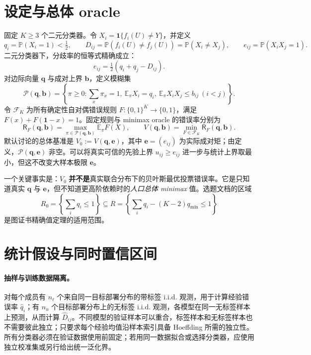 \documentclass[11pt,a4paper]{ctexart}
\theoremstyle{definition}
\newcommand{\calP}{\mathcal P}
\newcommand{\calF}{\mathcal F}
\newcommand{\Rsk}{\mathsf R}
\newcommand{\Pp}{\mathbb P}
\newcommand{\Ee}{\mathbb E}
\newcommand{\one}{\mathbf 1}
\newcommand{\evec}{\bm e}
\newcommand{\qvec}{\bm q}
\newcommand{\bvec}{\bm b}
\begin{document}
\section{设定与总体 oracle}
固定 $K\ge3$ 个二元分类器。令 $X_i=\one\{f_i(U)\ne Y\}$，并定义
\begin{equation}\label{eq:qD}
q_i=\Pp(X_i=1)<\tfrac12,\qquad
D_{ij}=\Pp(f_i(U)\ne f_j(U))=\Pp(X_i\ne X_j),\qquad
e_{ij}=\Pp(X_iX_j=1).
\end{equation}
二元分类器下，分歧率的恒等式精确成立：
\begin{equation}\label{eq:id}
e_{ij}=\tfrac12(q_i+q_j-D_{ij}).
\end{equation}
对边际向量 $\qvec$ 与成对上界 $\bvec$，定义模糊集
\begin{equation}\label{eq:ambig}
\calP(\qvec,\bvec)=\left\{\pi\ge0:\sum_x\pi_x=1,\ \Ee_\pi X_i=q_i,\ \Ee_\pi X_iX_j\le b_{ij}\ (i<j)\right\}.
\end{equation}
令 $\calF_K$ 为所有确定性自对偶错误规则 $F:\{0,1\}^K\to\{0,1\}$，满足 $F(x)+F(\one-x)=1$。固定规则与 minimax oracle 的错误率分别为
\begin{equation}\label{eq:R}
\Rsk_F(\qvec,\bvec)=\max_{\pi\in\calP(\qvec,\bvec)}\Ee_\pi F(X),\qquad
V(\qvec,\bvec)=\min_{F\in\calF_K}\Rsk_F(\qvec,\bvec).
\end{equation}
默认讨论的总体基准是 $V_0:=V(\qvec,\evec)$，其中 $\evec=(e_{ij})$ 为实际成对矩；由定义，$\calP(\qvec,\evec)$ 非空。可以将真实可信的先验上界 $u_{ij}\ge e_{ij}$ 进一步与统计上界取最小，但这不改变大样本极限 $\evec$。

一个关键事实是：$V_0$ \textbf{并不是}真实联合分布下的贝叶斯最优投票错误率。它是只知道真实 $\qvec$ 与 $\evec$，但不知道更高阶依赖时的\emph{人口总体 minimax} 值。选题文档的区域
\begin{equation}\label{eq:R0}
R_0=\left\{\sum_iq_i\le1\right\}\subseteq
R=\left\{\sum_iq_i-(K-2)q_{\min}\le1\right\}
\end{equation}
是图证书精确值定理的适用范围。

\section{统计假设与同时置信区间}
\paragraph{抽样与训练数据隔离。}
对每个成员有 $n_\ell$ 个来自同一目标部署分布的带标签 i.i.d. 观测，用于计算经验错误率 $\hat q_i$；有 $n_u$ 个目标部署分布上的无标签 i.i.d. 观测，各模型在同一无标签样本上预测，从而计算 $\hat D_{ij}$。不同模型的验证样本可以重合，标签样本和无标签样本也不需要彼此独立；只要求每个经验均值沿样本索引具备 Hoeffding 所需的独立性。所有分类器必须在验证数据使用前固定；若用同一数据拟合或选择分类器，应使用独立校准集或另行给出统一泛化界。
\end{document}
